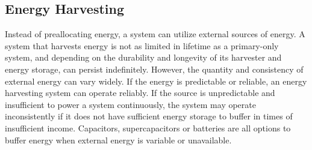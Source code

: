 \subsection{Energy Harvesting}
Instead of preallocating energy, a system can utilize external sources of energy.
A system that harvests energy is not as limited in lifetime as a primary-only system, and depending on the durability and longevity of its harvester and energy storage, can persist indefinitely. 
However, the quantity and consistency of external energy can vary widely. 
If the energy is predictable or reliable, an energy harvesting system can operate reliably.
If the source is unpredictable and insufficient to power a system continuously, the system may operate inconsistently if it does not have sufficient energy storage to buffer in times of insufficient income.
Capacitors, supercapacitors or batteries are all options to buffer energy when external energy is variable or unavailable.

